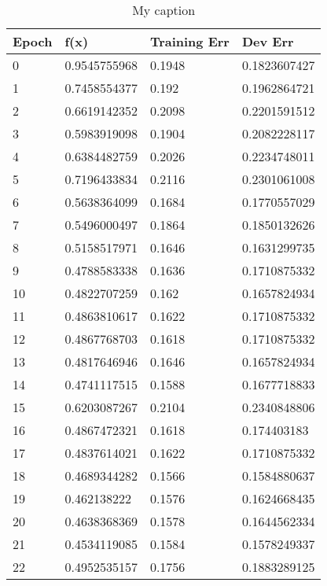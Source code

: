 \begin{table}[]
\centering
\caption{My caption}
\label{my-label}
\begin{tabular}{|l|l|l|l|}
\hline
Epoch & f(x)         & Training Err & Dev Err      \\ \hline
0     & 0.9545755968 & 0.1948       & 0.1823607427 \\ \hline
1     & 0.7458554377 & 0.192        & 0.1962864721 \\ \hline
2     & 0.6619142352 & 0.2098       & 0.2201591512 \\ \hline
3     & 0.5983919098 & 0.1904       & 0.2082228117 \\ \hline
4     & 0.6384482759 & 0.2026       & 0.2234748011 \\ \hline
5     & 0.7196433834 & 0.2116       & 0.2301061008 \\ \hline
6     & 0.5638364099 & 0.1684       & 0.1770557029 \\ \hline
7     & 0.5496000497 & 0.1864       & 0.1850132626 \\ \hline
8     & 0.5158517971 & 0.1646       & 0.1631299735 \\ \hline
9     & 0.4788583338 & 0.1636       & 0.1710875332 \\ \hline
10    & 0.4822707259 & 0.162        & 0.1657824934 \\ \hline
11    & 0.4863810617 & 0.1622       & 0.1710875332 \\ \hline
12    & 0.4867768703 & 0.1618       & 0.1710875332 \\ \hline
13    & 0.4817646946 & 0.1646       & 0.1657824934 \\ \hline
14    & 0.4741117515 & 0.1588       & 0.1677718833 \\ \hline
15    & 0.6203087267 & 0.2104       & 0.2340848806 \\ \hline
16    & 0.4867472321 & 0.1618       & 0.174403183  \\ \hline
17    & 0.4837614021 & 0.1622       & 0.1710875332 \\ \hline
18    & 0.4689344282 & 0.1566       & 0.1584880637 \\ \hline
19    & 0.462138222  & 0.1576       & 0.1624668435 \\ \hline
20    & 0.4638368369 & 0.1578       & 0.1644562334 \\ \hline
21    & 0.4534119085 & 0.1584       & 0.1578249337 \\ \hline
22    & 0.4952535157 & 0.1756       & 0.1883289125 \\ \hline

\end{tabular}
\end{table}

